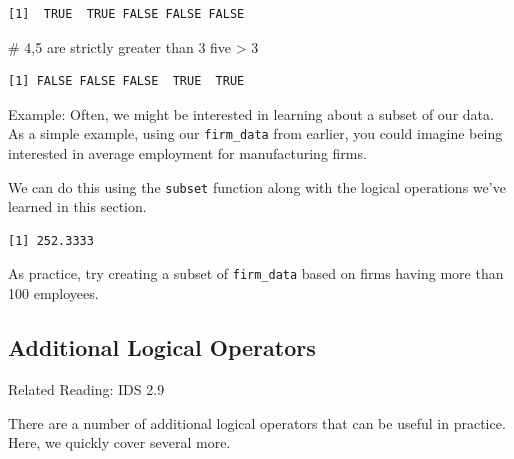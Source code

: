 \documentclass[
  letterpaper,
  DIV=11,
  numbers=noendperiod]{scrreprt}
\newenvironment{Shaded}{\begin{snugshade}}{\end{snugshade}}
\newcommand{\CommentTok}[1]{\textcolor[rgb]{0.37,0.37,0.37}{#1}}
\newcommand{\DecValTok}[1]{\textcolor[rgb]{0.68,0.00,0.00}{#1}}
\newcommand{\FunctionTok}[1]{\textcolor[rgb]{0.28,0.35,0.67}{#1}}
\newcommand{\NormalTok}[1]{\textcolor[rgb]{0.00,0.23,0.31}{#1}}
\newcommand{\OtherTok}[1]{\textcolor[rgb]{0.00,0.23,0.31}{#1}}
\newcommand{\SpecialCharTok}[1]{\textcolor[rgb]{0.37,0.37,0.37}{#1}}
\newcommand{\StringTok}[1]{\textcolor[rgb]{0.13,0.47,0.30}{#1}}
\begin{document}
\begin{verbatim}
[1]  TRUE  TRUE FALSE FALSE FALSE
\end{verbatim}

\begin{Shaded}
\begin{Highlighting}[]
\CommentTok{\# 4,5 are strictly greater than 3}
\NormalTok{five }\SpecialCharTok{\textgreater{}} \DecValTok{3}
\end{Highlighting}
\end{Shaded}

\begin{verbatim}
[1] FALSE FALSE FALSE  TRUE  TRUE
\end{verbatim}

{Example: }Often, we might be interested in learning about a subset of
our data. As a simple example, using our \texttt{firm\_data} from
earlier, you could imagine being interested in average employment for
manufacturing firms.

We can do this using the \texttt{subset} function along with the logical
operations we've learned in this section.

\begin{Shaded}
\end{Shaded}

\begin{verbatim}
[1] 252.3333
\end{verbatim}

As practice, try creating a subset of \texttt{firm\_data} based on firms
having more than 100 employees.

\subsection{Additional Logical
Operators}\label{additional-logical-operators}

Related Reading: IDS 2.9

There are a number of additional logical operators that can be useful in
practice. Here, we quickly cover several more.
\end{document}

